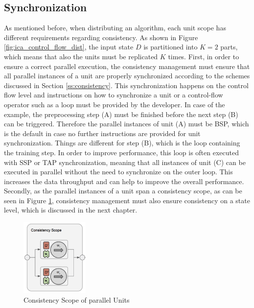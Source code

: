 \subsection{Synchronization}
\label{ss:synchronization}
As mentioned before, when distributing an algorithm, each unit scope has different requirements regarding consistency.
As shown in Figure \ref{fig:ica_control_flow_dist}, the input state $D$ is partitioned into $K = 2$ parts, which means that also the units must be replicated $K$ times.
First, in order to ensure a correct parallel execution, the consistency management must ensure that all parallel instances of a unit are properly synchronized according to the schemes discussed in Section \ref{ss:consistency}.
This synchronization happens on the control flow level and instructions on how to synchronize a unit or a control-flow operator such as a loop must be provided by the developer.
In case of the example, the preprocessing step (A) must be finished before the next step (B) can be triggered.
Therefore the parallel instances of unit (A) must be BSP, which is the default in case no further instructions are provided for unit synchronization.
Things are different for step (B), which is the loop containing the training step.
In order to improve performance, this loop is often executed with SSP or TAP synchronization, meaning that all instances of unit (C) can be executed in parallel without the need to synchronize on the outer loop.
This increases the data throughput and can help to improve the overall performance.
Secondly, as the parallel instances of a unit span a consistency scope, as can be seen in Figure \ref{fig:consistency_scope}, consistency management must also ensure consistency on a state level, which is discussed in the next chapter.
\begin{figure}[ht]
\centering
\includegraphics[width=0.3\textwidth]{img/consistency_scope.png}
\caption{Consistency Scope of parallel Units}
\label{fig:consistency_scope}
\end{figure}

